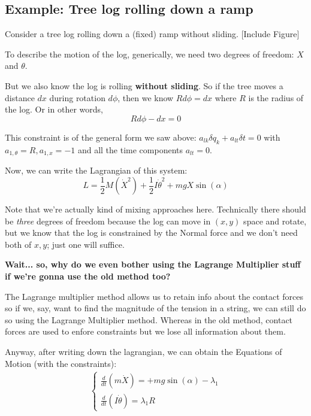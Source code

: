 \documentclass[11pt]{article}
\begin{document}
\subsection{Example: Tree log rolling down a ramp}

Consider a tree log rolling down a (fixed) ramp without sliding.
\vskip 0.5cm
[Include Figure]

\vskip 0.5cm
To describe the motion of the log, generically, we need two degrees of freedom: $X$ and $\theta$.

\vskip 0.5cm
But we also know the log is rolling \textbf{without sliding}. So if the tree moves a distance $dx$ during rotation $d\phi$, then we know $Rd\phi = dx$
where $R$ is the radius of the log. Or in other words,
\[ R d\phi - dx = 0 \]

\vskip 0.5cm
This constraint is of the general form we saw above: 
$ \boxed{a_{lk} \delta q_{k} + a_{lt} \delta t = 0 }$
with $a_{1,\theta} = R, a_{1, x} = -1$ and all the time components $a_{lt} = 0$.

\vskip 0.5cm
Now, we can write the Lagrangian of this system: 
\[ L = \frac{1}{2}M(\dot{X}^2) + \frac{1}{2}I \dot{\theta}^2 + mg X \sin(\alpha) \]

Note that we're actually kind of mixing approaches here. Technically there should be \emph{three} degrees of freedom because the log can move in $(x,y)$ space and rotate, but we know that the log is constrained by the Normal force and we don't need both of $x,y$; just one will suffice.

\begin{bluebox}
  \textbf{Wait... so, why do we even bother using the Lagrange Multiplier stuff if we're gonna use the old method too?} 

  \vskip 0.5cm
  The Lagrange multiplier method allows us to retain info about the contact forces so if we, say, want to find the magnitude of the tension in a string, we can still do so using the Lagrange Multiplier method. Whereas in the old method, contact forces are used to enfore constraints but we lose all information about them.
\end{bluebox}

\vskip 0.5cm
Anyway, after writing down the lagrangian, we can obtain the Equations of Motion (with the constraints):
\begin{align*}
  \begin{cases}
    \frac{d}{dt} \left( m\dot{X}\right) = +mg \sin(\alpha) - \lambda_1 \\
    \frac{d}{dt} \left( I \dot{\theta} \right) = \lambda_1 R
  \end{cases}
\end{align*}
\end{document}
